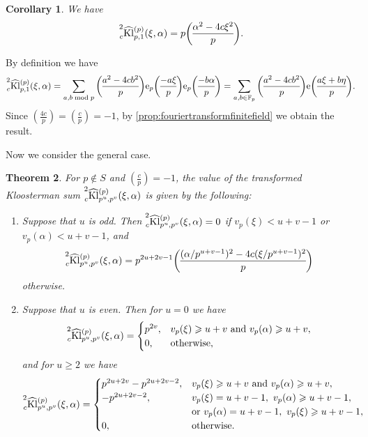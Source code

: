 \documentclass[10pt,oneside,reqno]{amsart}
\makeatletter
\newcommand\rme{\mathrm{e}}
\newcommand\FF{\mathbb{F}}
\newcommand\Kl{\mathrm{Kl}}
\renewcommand\geq{\geqslant}
\newcommand\legendresymbol[2]{\genfrac{(}{)}{}{}{#1}{#2}}
\theoremstyle{THEOREM}
\newtheorem{theorem}{Theorem}[section]
\newtheorem{corollary}[theorem]{Corollary}
\theoremstyle{DEFINITION}
\theoremstyle{EXERCISE}
\numberwithin{equation}{section}
\renewenvironment{proof}[1][\proofname]{\par
  \vspace{-6pt}
  \pushQED{\qed}
  \normalfont \topsep6\p@\@plus6\p@\relax
  \trivlist
  \item[\hskip\labelsep\rmfamily\bfseries
    #1\@addpunct{:}]\ignorespaces
}{
  \popQED\endtrivlist\@endpefalse
  \vspace{-6pt}
}
\makeatother
\begin{document}
\begin{corollary}\label{cor:fouriertransformfinitefield}
We have
\[
\prescript{2}{c}{\widehat{\Kl}}_{p,1}^{(p)}(\xi,\alpha)=p\legendresymbol{\alpha^2-4c\xi^2}{p}.
\]
\end{corollary}
\begin{proof}
By definition we have
\[
\prescript{2}{c}{\widehat{\Kl}}_{p,1}^{(p)}(\xi,\alpha)=\sum_{a,b\bmod p}\legendresymbol{a^2-4cb^2}{p}\rme_p\legendresymbol{-a\xi}{p} \rme_p\legendresymbol{-b\alpha}{p}=\sum_{a,b\in \FF_p}\legendresymbol{a^2-4cb^2}{p}\rme\legendresymbol{a\xi+b\eta}{p}.
\]
Since $\legendresymbol{4c}{p}=\legendresymbol{c}{p}=-1$, by
\autoref{prop:fouriertransformfinitefield} we obtain the result.
\end{proof}

Now we consider the general case.
\begin{theorem}\label{thm:localkloostermaninert}
 For $p\notin S$ and $\legendresymbol{c}{p}=-1$, the value of the transformed Kloosterman sum $\prescript{2}{c}{\widehat{\Kl}}_{p^u,p^v}^{(p)}(\xi,\alpha)$ is given by the following:
\begin{enumerate}[itemsep=0pt,parsep=0pt,topsep=0pt, leftmargin=0pt,labelsep=2.5pt,itemindent=15pt,label=\upshape{(\arabic*)}]
  \item Suppose that $u$ is odd. Then $\prescript{2}{c}{\widehat{\Kl}}_{p^u,p^v}^{(p)}(\xi,\alpha)=0$ if $v_p(\xi)<u+v-1$ or $v_p(\alpha)<u+v-1$, and
      \[
      \prescript{2}{c}{\widehat{\Kl}}_{p^u,p^v}^{(p)}(\xi,\alpha)=p^{2u+2v-1} \legendresymbol{(\alpha/p^{u+v-1})^2-4c(\xi/p^{u+v-1})^2}{p}
      \]
      otherwise.
\item Suppose that $u$ is even. Then for $u=0$ we have
      \[
      \prescript{2}{c}{\widehat{\Kl}}_{p^u,p^v}^{(p)}(\xi,\alpha)=\begin{cases}
                                                                   p^{2v}, & v_p(\xi)\geq u+v\ \text{and}\ v_p(\alpha)\geq u+v, \\
                                                                   0, & \text{otherwise},
                                                                 \end{cases}
      \]
      and for $u\geq 2$ we have
      \[
      \prescript{2}{c}{\widehat{\Kl}}_{p^u,p^v}^{(p)}(\xi,\alpha)=\begin{cases}
                                                                   p^{2u+2v}-p^{2u+2v-2}, & v_p(\xi)\geq u+v\ \text{and}\ v_p(\alpha)\geq u+v, \\
                                                                   -p^{2u+2v-2},& v_{p}(\xi)=u+v-1,\ v_p(\alpha)\geq u+v-1,\\
                                                                   &\text{or}\ v_{p}(\alpha)=u+v-1,\ v_p(\xi)\geq u+v-1,\\
                                                                   0, & \text{otherwise}.
                                                                 \end{cases}
      \]
\end{enumerate}
\end{theorem}
\end{document}
